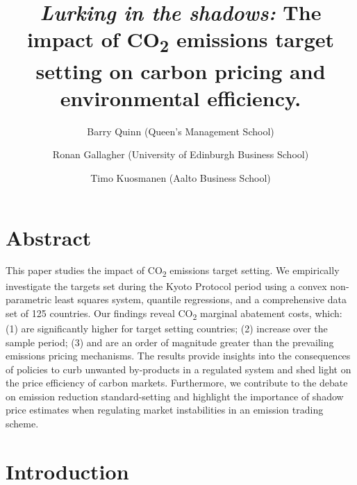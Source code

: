 \documentclass[
  letterpaper,
  DIV=11,
  numbers=noendperiod]{scrartcl}
\title{\emph{Lurking in the shadows:} The impact of CO\textsubscript{2}
emissions target setting on carbon pricing and environmental
efficiency.}
\author{Barry Quinn (Queen's Management School) \and Ronan Gallagher
(University of Edinburgh Business School) \and Timo Kuosmanen (Aalto
Business School)}
\date{}
\begin{document}
\maketitle

\ifdefined\Shaded\renewenvironment{Shaded}{\begin{tcolorbox}[interior hidden, sharp corners, boxrule=0pt, breakable, frame hidden, borderline west={3pt}{0pt}{shadecolor}, enhanced]}{\end{tcolorbox}}\fi

\hypertarget{abstract}{%
\section{Abstract}\label{abstract}}

This paper studies the impact of CO\textsubscript{2} emissions target
setting. We empirically investigate the targets set during the Kyoto
Protocol period using a convex non-parametric least squares system,
quantile regressions, and a comprehensive data set of 125 countries. Our
findings reveal CO\textsubscript{2} marginal abatement costs, which: (1)
are significantly higher for target setting countries; (2) increase over
the sample period; (3) and are an order of magnitude greater than the
prevailing emissions pricing mechanisms. The results provide insights
into the consequences of policies to curb unwanted by-products in a
regulated system and shed light on the price efficiency of carbon
markets. Furthermore, we contribute to the debate on emission reduction
standard-setting and highlight the importance of shadow price estimates
when regulating market instabilities in an emission trading scheme.

\newpage

\hypertarget{introduction}{%
\section{Introduction}\label{introduction}}
\end{document}
